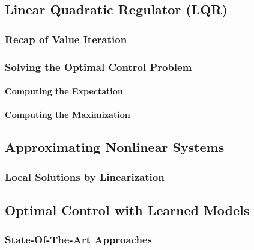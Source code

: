 		\subsection{Linear Quadratic Regulator (LQR)} %

			\subsubsection{Recap of Value Iteration} %

			\subsubsection{Solving the Optimal Control Problem} %

				\paragraph{Computing the Expectation} %

				\paragraph{Computing the Maximization} %

		\subsection{Approximating Nonlinear Systems} %

			\subsubsection{Local Solutions by Linearization} %

		\subsection{Optimal Control with Learned Models} %

			\subsubsection{State-Of-The-Art Approaches} %

